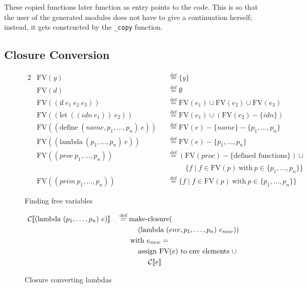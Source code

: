 \documentclass[11pt]{report}
\newcommand{\eqdef}{\stackrel{\text{def}}{=}}%
\begin{document}
These copied functions later function as entry points to the code. This is so that the user of the generated modules does not have to give a continuation herself; instead, it gets constructed by the \texttt{_copy} function.

\subsection{Closure Conversion}
\begin{figure}[p]
\begin{alignat*}{2}
&\text{FV}(y) &&\eqdef \{y\}\\
&\text{FV}(d) &&\eqdef \emptyset\\
&\text{FV}((\text{if}\ e_1\ e_2\ e_3)) &&\eqdef \text{FV}(e_1) \cup \text{FV}(e_2) \cup \text{FV}(e_3)\\
&\text{FV}((\text{let}\ ((idn\ e_1))\ e_2)) &&\eqdef \text{FV}(e_1) \cup (\text{FV}(e_2) - \{idn\})\\
&\text{FV}((\text{define}\ (name, p_1, \dots, p_n)\ e)) &&\eqdef \text{FV}(e) - \{name\} - \{p_1, \dots, p_n\}\\
&\text{FV}((\text{lambda}\ (p_1, \dots, p_n)\ e)) &&\eqdef \text{FV}(e) - \{p_1, \dots, p_n\}\\
&\text{FV}((proc\ p_1, \dots, p_n)) &&\eqdef (\text{FV}(proc) - \{\text{defined functions}\}) \cup \\
&&&\hspace{1cm}\{f \mid f \in \text{FV}(p)\ \text{with}\ p \in \{p_1, \dots, p_n\}\}\\
&\text{FV}((prim\ p_1, \dots, p_n)) &&\eqdef \{f \mid f \in \text{FV}(p)\ \text{with}\ p \in \{p_1, \dots, p_n\}\}
\end{alignat*}
\caption{Finding free variables}
\label{ccfreevar}
\end{figure}

\begin{figure}[p]
\begin{alignat*}{2}
&\mathcal{C}\llbracket (\text{lambda}\ (p_1, \dots, p_n)\ e) \rrbracket &&\eqdef \text{make-closure}(\\
&&&\hspace{1cm}(\text{lambda}\ (env, p_1, \dots, p_n)\ e_{new}))\\
&&&\hspace{0.625cm}\text{with}\ e_{new} = \\
&&&\hspace{1cm}\text{assign FV($e$) to env elements}\ \cup \\
&&&\hspace{1.5cm}\mathcal{C}\llbracket e \rrbracket\\
\end{alignat*}
\caption{Closure converting lambdas}
\label{cclambda}
\end{figure}
\end{document}
